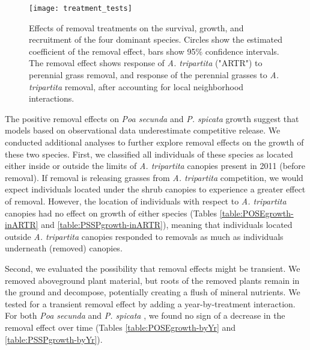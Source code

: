\documentclass[11pt]{article}
\begin{document}
\begin{doublespacing}
 \begin{figure}[tbp]
 \centering
 \texttt{[image: treatment\_tests]}
 \caption{Effects of removal treatments on the survival, growth, and recruitment of the four dominant species. Circles show the estimated coefficient of the removal effect, bars show 95\% confidence intervals. The removal effect shows response of \textit{A. tripartita} ("ARTR") to perennial grass removal, and response of the perennial grasses to \textit{A. tripartita} removal, after accounting for local neighborhood interactions. }
 \label{fig:VitalRateTest}
 \end{figure}




The positive removal effects on \textit{Poa secunda}  and \textit{P. spicata} growth suggest that models based on observational data underestimate competitive release. We conducted additional analyses to further explore removal effects on the growth of these two species. First, we classified all individuals of these species as located either inside or outside the limits of \textit{A. tripartita} canopies present in 2011 (before removal). If removal is releasing grasses from \textit{A. tripartita} competition, we would expect individuals located under the shrub canopies to experience a greater effect of removal. However, the location of individuals with respect to \textit{A. tripartita} canopies had no effect on growth of either species (Tables \ref{table:POSEgrowth-inARTR} and \ref{table:PSSPgrowth-inARTR}), meaning that individuals located outside \textit{A. tripartita} canopies responded to removals as much as individuals underneath (removed) canopies. 

Second, we evaluated the possibility that removal effects might be transient. We removed aboveground plant material, but roots of the removed plants remain in the ground and decompose, potentially creating a flush of mineral nutrients. We tested for a transient removal effect by adding a year-by-treatment interaction. For both  \textit{Poa secunda}  and \textit{P. spicata} , we found no sign of a decrease in the removal effect over time (Tables \ref{table:POSEgrowth-byYr} and \ref{table:PSSPgrowth-byYr}).


\end{doublespacing}
\end{document}
